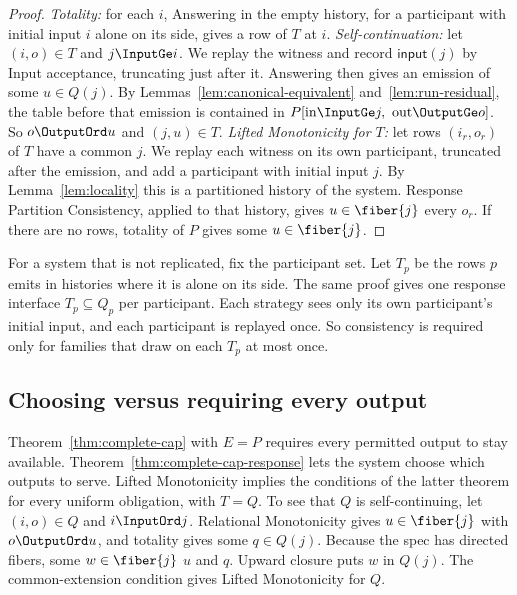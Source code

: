 \begin{proof}
\emph{Totality:} for each $i$, Answering in the empty history, for a
participant with initial input $i$ alone on its side, gives a row of $T$ at
$i$.  \emph{Self-continuation:} let $(i,o)\in T$ and $j\InputGe i$.  We replay
the witness and record $\mathsf{input}(j)$ by Input acceptance, truncating
just after it.  Answering then gives an emission of some $u\in Q(j)$.  By
Lemmas~\ref{lem:canonical-equivalent} and~\ref{lem:run-residual}, the table
before that emission is contained in $P[\mathrm{in}\InputGe j,\
\mathrm{out}\OutputGe o]$.  So $o\OutputOrd u$ and $(j,u)\in T$.
\emph{Lifted Monotonicity for $T$:} let rows $(i_r,o_r)$ of $T$ have a common
\indesc $j$.  We replay each witness on its own participant, truncated after
the emission, and add a participant with initial input $j$.  By
Lemma~\ref{lem:locality} this is a partitioned history of the system.
Response Partition Consistency, applied to that history, gives
$u\in\fiber{j}$ \outrelpart every $o_r$.  If there are no rows, totality of
$P$ gives some $u\in\fiber{j}$.
\end{proof}

\begin{remark}
For a system that is not replicated, fix the participant set.  Let $T_p$ be
the rows $p$ emits in histories where it is alone on its side.  The same proof
gives one response interface $T_p\subseteq Q_p$ per participant.  Each
strategy sees only its own participant's initial input, and each participant
is replayed once.  So consistency is required only for families that draw on
each $T_p$ at most once.
\end{remark}

\subsection{Choosing versus requiring every output}

Theorem~\ref{thm:complete-cap} with $E=P$ requires every permitted output to
stay available.  Theorem~\ref{thm:complete-cap-response} lets the system
choose which outputs to serve.  Lifted Monotonicity implies the conditions of
the latter theorem for every uniform obligation, with $T=Q$.  To see that $Q$
is self-continuing, let $(i,o)\in Q$ and $i\InputOrd j$.  Relational
Monotonicity gives $u\in\fiber{j}$ with $o\OutputOrd u$, and totality gives
some $q\in Q(j)$.  Because the spec has directed fibers, some $w\in\fiber{j}$
\outrelpart $u$ and $q$.  Upward closure puts $w$ in $Q(j)$.  The
common-extension condition gives Lifted Monotonicity for $Q$.

